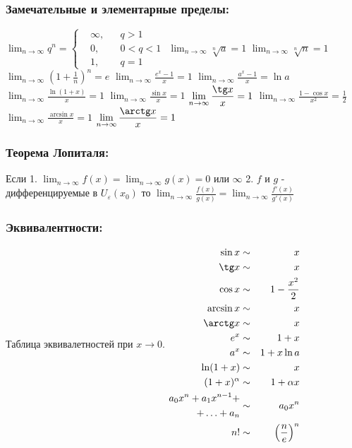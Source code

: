 \subsubsection{Замечательные и элементарные пределы:}
$\displaystyle \lim_{n\to \infty} q^n = \left\{ \begin{aligned}
		&\infty, &&q > 1 \\
		&0, &&0 < q < 1 \\
		&1, &&q = 1
	\end{aligned} \right. $
$\displaystyle \lim_{n\to \infty} \sqrt[n]{a} = 1 $
$\displaystyle \lim_{n\to \infty} \sqrt[n]{n} = 1 $
$\displaystyle \lim_{n\to \infty} \left( 1 + \frac{1}{n} \right)^n = e $
$\displaystyle \lim_{n\to \infty} \frac{e^x - 1}{x} = 1 $
$\displaystyle \lim_{n\to \infty} \frac{a^x - 1}{x} = \ln a $
$\displaystyle \lim_{n\to \infty} \frac{\ln(1+x)}{x} = 1 $
$\displaystyle \lim_{n\to \infty} \frac{\sin x}{x} = 1 $
$\displaystyle \lim_{n\to \infty} \frac{\tg x}{x} = 1 $
$\displaystyle \lim_{n\to \infty} \frac{1 - \cos x}{x^2} = \frac12 $
$\displaystyle \lim_{n\to \infty} \frac{\arcsin x}{x} = 1 $
$\displaystyle \lim_{n\to \infty} \frac{\arctg x}{x} = 1 $
\subsubsection{Теорема Лопиталя:}
Если
1. $\displaystyle \lim_{n\to \infty} f(x) = \lim_{n\to \infty} g(x) = 0 \text{ или } \infty $
2. $\displaystyle f $ и $\displaystyle g $ - дифференцируемые в $\displaystyle U_\varepsilon(x_0) $
то
$\displaystyle \lim_{n\to \infty} \frac{f(x)}{g(x)} = \lim_{n\to \infty} \frac{f'(x)}{g'(x)} $
\subsubsection{Эквивалентности:}
Таблица эквивалетностей при $\displaystyle x\to 0 $.
$\displaystyle \begin{aligned}
	\sin x & \sim & x \\
	\tg x & \sim & x \\
	\cos x & \sim & 1 - \frac{x^2}{2} \\
	\arcsin x & \sim & x \\
	\arctg x & \sim & x \\
	e^x & \sim & 1 + x \\
	a^x & \sim & 1 + x\ln a \\
	\ln (1 + x) & \sim & x \\
	(1+x)^\alpha & \sim & 1 + \alpha x \\
	\begin{aligned}
		a_0 x^n + a_1 x^{n-1} + \\
		+ \ldots + a_n
	\end{aligned} & \sim & a_0 x^n \\
	n! & \sim & \left(\frac{n}{e}\right)^n
\end{aligned} $
